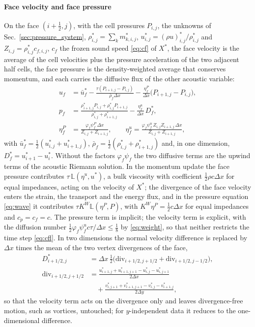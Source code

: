 \documentclass[a4paper,fleqn]{cas-sc}
\begin{document}
\paragraph{Face velocity and face pressure}
On the face $(i+\tfrac12,j)$, with the cell pressures $P_{i,j}$, the unknowns of Sec.~\ref{sec:pressure_system}, $\rho^*_{i,j}=\sum_km^*_{k,i,j}$, $u^*_{i,j}=(\rho u)^*_{i,j}/\rho^*_{i,j}$ and $Z_{i,j}=\rho^*_{i,j}c_{f,i,j}$, $c_f$ the frozen
sound speed \eqref{eq:cf} of $X^*$, the face velocity is the average of the cell velocities plus the pressure acceleration of the two
adjacent half cells, the face pressure is the density-weighted average that conserves momentum, and each carries the
diffusive flux of the other acoustic variable:
\begin{equation}
\begin{aligned}
u_f&=\bar u^*_f-\frac{\tau(P_{i+1,j}-P_{i,j})}{\bar\rho_f\Delta x}-\frac{\eta^P_f}{\Delta x}\big(P_{i+1,j}-P_{i,j}\big),\\
p_f&=\frac{\rho^*_{i+1,j}P_{i,j}+\rho^*_{i,j}P_{i+1,j}}{\rho^*_{i,j}+\rho^*_{i+1,j}}-\frac{\eta^u_f}{\Delta x}\,D^*_f,\\
\eta^P_f&=\frac{\varphi_f\psi^P_f\,\Delta x}{Z_{i,j}+Z_{i+1,j}},\qquad \eta^u_f=\frac{\varphi_f\psi^u_f\,Z_{i,j}Z_{i+1,j}\,\Delta x}{Z_{i,j}+Z_{i+1,j}},
\end{aligned}
\label{eq:faces}
\end{equation}
with $\bar u^*_f=\tfrac12(u^*_{i,j}+u^*_{i+1,j})$, $\bar\rho_f=\tfrac12(\rho^*_{i,j}+\rho^*_{i+1,j})$ and, in one dimension, $D^*_f=u^*_{i+1}-u^*_i$. Without the
factors $\varphi_f\psi_f$ the two diffusive terms are the upwind terms of the acoustic Riemann solution. In the momentum update the
face pressure contributes $\tau\,\mathbb L(\eta^u,u^*)$, a bulk viscosity with coefficient $\tfrac12\rho c\Delta x$ for equal impedances, acting on
the velocity of $X^*$; the
divergence of the face velocity enters the strain, the transport and the energy flux, and in the pressure equation
\eqref{eq:wave} it contributes $\tau K^W\mathbb L(\eta^P,P)$, with $K^W\eta^P=\tfrac12c\Delta x$ for equal impedances and $c_p=c_f=c$. The pressure term is implicit; the velocity term is explicit,
with the diffusion number $\tfrac12\varphi_f\psi^u_fc\tau/\Delta x\le\tfrac18$ by \eqref{eq:weight}, so that neither restricts the time step \eqref{eq:cfl}. In two dimensions the
normal velocity difference is replaced by $\Delta x$ times the mean of the two vertex divergences of the face,
\begin{equation}
\begin{aligned}
D^*_{i+1/2,j}&=\Delta x\,\tfrac12\big(\mathrm{div}_{i+1/2,j+1/2}+\mathrm{div}_{i+1/2,j-1/2}\big),\\
\mathrm{div}_{i+1/2,j+1/2}&=\frac{u^*_{i+1,j}+u^*_{i+1,j+1}-u^*_{i,j}-u^*_{i,j+1}}{2\Delta x}\\
&\quad+\frac{v^*_{i,j+1}+v^*_{i+1,j+1}-v^*_{i,j}-v^*_{i+1,j}}{2\Delta y},
\end{aligned}
\label{eq:vertex_div}
\end{equation}
so that the velocity term acts on the divergence only and leaves divergence-free motion, such as vortices, untouched;
for $y$-independent data it reduces to the one-dimensional difference.
\end{document}
